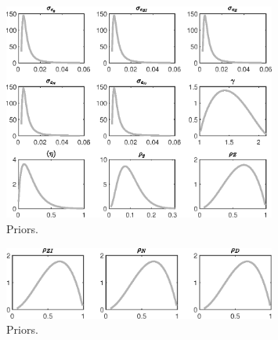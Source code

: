 
\begin{figure}[H]
\centering
\includegraphics[width=0.80\textwidth]{BRS_growth_res/graphs/BRS_growth_res_Priors1}
\caption{Priors.}\label{Fig:Priors:1}
\end{figure}
\begin{figure}[H]
\centering
\includegraphics[width=0.80\textwidth]{BRS_growth_res/graphs/BRS_growth_res_Priors2}
\caption{Priors.}\label{Fig:Priors:2}
\end{figure}
 
